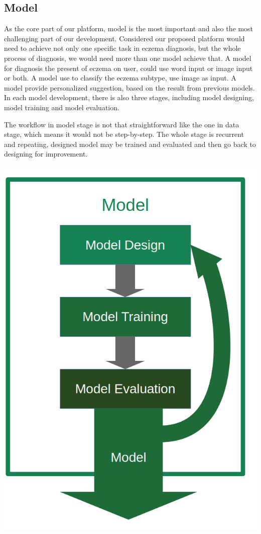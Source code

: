     \subsection{Model}
        As the core part of our platform, model is the most important and also the most challenging part of our development. Considered our proposed platform would need to achieve not only one specific task in eczema diagnosis, but the whole process of diagnosis, we would need more than one model achieve that. A model for diagnosis the present of eczema on user, could use word input or image input or both. A model use to classify the eczema subtype, use image as input. A model provide personalized suggestion, based on the result from previous models. In each model development, there is also three stages, including model designing, model training and model evaluation.

        The workflow in model stage is not that straightforward like the one in data stage, which means it would not be step-by-step. The whole stage is recurrent and repeating, designed model may be trained and evaluated and then go back to designing for improvement.
        
        \begin{Figure}
            \centering
            \includegraphics[width=\linewidth]{Image/ModelWorkflow.png}
        \end{Figure}

